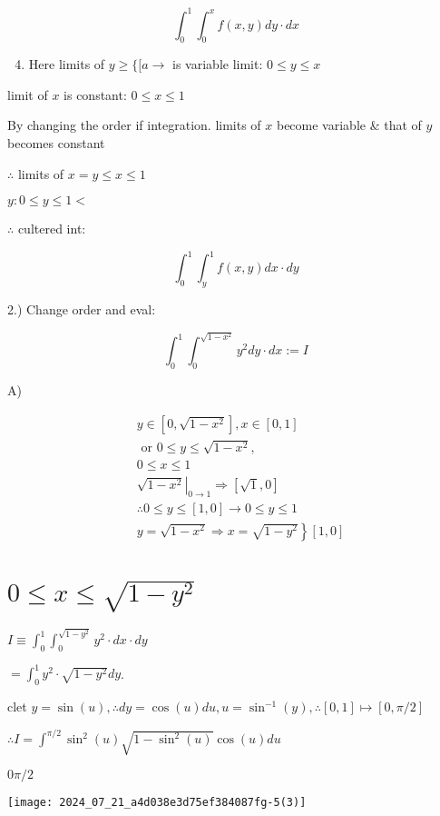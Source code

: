 \documentclass[12pt, a4paper]{article}
\begin{document}
$$
\int_{0}^{1} \int_{0}^{x} f(x, y) d y \cdot d x
$$

\begin{enumerate}
  \setcounter{enumi}{3}
  \item Here limits of $y \geq\{[a \rightarrow$ is variable limit: $0 \leq y \leq x$
\end{enumerate}

limit of $x$ is constant: $0 \leq x \leq 1$

By changing the order if integration. limits of $x$ become variable \& that of $y$ becomes constant

$\therefore$ limits of $x=y \leq x \leq 1$

$y: 0 \leq y \leq 1<$

$\therefore$ cultered int:

$$
\int_{0}^{1} \int_{y}^{1} f(x, y) d x \cdot d y
$$

2.) Change order and eval:

$$
\int_{0}^{1} \int_{0}^{\sqrt{1-x^{2}}} y^{2} d y \cdot d x:=I
$$

A)

$$
\begin{aligned}
& y \in\left[0, \sqrt{1-x^{2}}\right], x \in[0,1] \\
& \text { or } 0 \leq y \leq \sqrt{1-x^{2}}, \\
& 0 \leq x \leq 1 \\
& \left.\sqrt{1-x^{2}}\right|_{0 \rightarrow 1} \Rightarrow[\sqrt{1}, 0] \\
& \therefore 0 \leq y \leq[1,0] \rightarrow 0 \leq y \leq 1 \\
& \left.y=\sqrt{1-x^{2}} \Rightarrow x=\sqrt{1-y^{2}}\right\}[1,0]
\end{aligned}
$$

\section*{$0 \leq x \leq \sqrt{1-y^{2}}$}
$I \equiv \int_{0}^{1} \int_{0}^{\sqrt{1-y^{2}}} y^{2} \cdot d x \cdot d y$

$=\int_{0}^{1} y^{2} \cdot \sqrt{1-y^{2}} d y$.

clet $y=\sin (u), \therefore d y=\cos (u) d u, u=\sin ^{-1}(y), \therefore[0,1] \mapsto[0, \pi / 2]$

$\therefore I=\int^{\pi / 2} \sin ^{2}(u) \sqrt{1-\sin ^{2}(u)} \cos (u) d u$

$0 \pi / 2$

\begin{center}
\texttt{[image: 2024\_07\_21\_a4d038e3d75ef384087fg-5(3)]}
\end{center}
\end{document}
